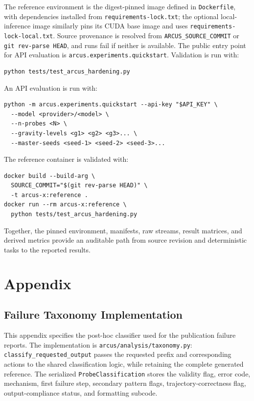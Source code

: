 \documentclass{article}
\begin{document}
The reference environment is the digest-pinned image defined in
\texttt{Dockerfile}, with dependencies installed from
\texttt{requirements-lock.txt}; the optional local-inference image similarly
pins its CUDA base image and uses \texttt{requirements-lock-local.txt}. Source
provenance is resolved from \texttt{ARCUS\_SOURCE\_COMMIT} or
\texttt{git rev-parse HEAD}, and runs fail if neither is available. The public
entry point for API evaluation is \texttt{arcus.experiments.quickstart}.
Validation is run with:
\begin{verbatim}
python tests/test_arcus_hardening.py
\end{verbatim}
An API evaluation is run with:
\begin{verbatim}
python -m arcus.experiments.quickstart --api-key "$API_KEY" \
  --model <provider>/<model> \
  --n-probes <N> \
  --gravity-levels <g1> <g2> <g3>... \
  --master-seeds <seed-1> <seed-2> <seed-3>...
\end{verbatim}
The reference container is validated with:
\begin{verbatim}
docker build --build-arg \
  SOURCE_COMMIT="$(git rev-parse HEAD)" \
  -t arcus-x:reference .
docker run --rm arcus-x:reference \
  python tests/test_arcus_hardening.py
\end{verbatim}
Together, the pinned environment, manifests, raw streams, result matrices,
and derived metrics provide an auditable path from source revision and
deterministic tasks to the reported results.



\appendix
\section{Appendix}
\subsection{Failure Taxonomy Implementation}
\label{app:failure_taxonomy}
This appendix specifies the post-hoc classifier used for the
publication failure reports. The implementation is
\texttt{arcus/analysis/taxonomy.py}: \texttt{classify\_requested\_output}
passes the requested prefix and corresponding actions to the shared
classification logic, while retaining the complete generated reference.
The serialized \texttt{ProbeClassification}
stores the validity flag, error code, mechanism, first failure step, secondary
pattern flags, trajectory-correctness flag, output-compliance status, and
formatting subcode.
\end{document}
